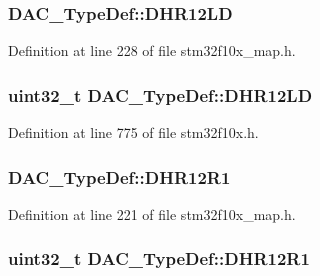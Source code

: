 \subsubsection[{\texorpdfstring{D\+H\+R12\+LD}{DHR12LD}}]{ D\+A\+C\+\_\+\+Type\+Def\+::\+D\+H\+R12\+LD}\hypertarget{struct_d_a_c___type_def_a7716c04c60dc39b08be2088347a144ee}{}\label{struct_d_a_c___type_def_a7716c04c60dc39b08be2088347a144ee}


Definition at line 228 of file stm32f10x\+\_\+map.\+h.

\subsubsection[{\texorpdfstring{D\+H\+R12\+LD}{DHR12LD}}]{ {\bf uint32\+\_\+t} D\+A\+C\+\_\+\+Type\+Def\+::\+D\+H\+R12\+LD}\hypertarget{struct_d_a_c___type_def_aea4d055e3697999b44cdcf2702d79d40}{}\label{struct_d_a_c___type_def_aea4d055e3697999b44cdcf2702d79d40}


Definition at line 775 of file stm32f10x.\+h.

\subsubsection[{\texorpdfstring{D\+H\+R12\+R1}{DHR12R1}}]{ D\+A\+C\+\_\+\+Type\+Def\+::\+D\+H\+R12\+R1}\hypertarget{struct_d_a_c___type_def_a999c6632fe6a753d663d5b47154d5593}{}\label{struct_d_a_c___type_def_a999c6632fe6a753d663d5b47154d5593}


Definition at line 221 of file stm32f10x\+\_\+map.\+h.

\subsubsection[{\texorpdfstring{D\+H\+R12\+R1}{DHR12R1}}]{ {\bf uint32\+\_\+t} D\+A\+C\+\_\+\+Type\+Def\+::\+D\+H\+R12\+R1}\hypertarget{struct_d_a_c___type_def_afbfd2855cdb81939b4efc58e08aaf3e5}{}\label{struct_d_a_c___type_def_afbfd2855cdb81939b4efc58e08aaf3e5}


